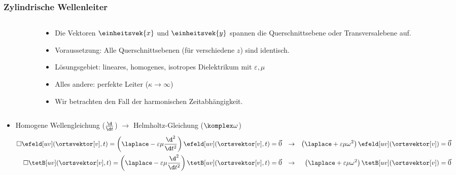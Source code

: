 \begin{frame}
  \frametitle{Zylindrische Wellenleiter}
  \begin{columns}
    \begin{column}{.3\linewidth}
  \end{column}
  \begin{column}{.7\linewidth}
      \begin{itemize}[<+->]
      \item Die Vektoren \(\einheitsvek{x}\) und \(\einheitsvek{y}\) spannen die \alert{Querschnittsebene} oder \alert{Transversalebene} auf.
      \item Voraussetzung: Alle Querschnittsebenen (für verschiedene \(z\)) sind identisch.
      \item Lösungsgebiet: lineares, homogenes, isotropes Dielektrikum mit \(\varepsilon, \mu\)
      \item Alles andere: perfekte Leiter (\(\kappa \to \infty\))
        \item Wir betrachten den Fall der \alert{harmonischen Zeitabhängigkeit}.
        \end{itemize}
  \end{column}
    \end{columns}
      \begin{itemize}[<+->]
      \item Homogene Wellengleichung (\(\frac{\d}{\d t}\)) \(\to\) \alert{Helmholtz-Gleichung} (\(\komplex\omega\))
        \begin{align*}
          \square \efeld[uv](\ortsvektor[v], t) = \left(\laplace - \varepsilon\mu\frac{\d^2}{\d t^2}\right) \efeld[uv] (\ortsvektor[v], t) = \vec{0} &&\rightarrow  &&\left(\laplace + \varepsilon\mu\omega^2\right) \efeld[uv](\ortsvektor[v]) =\vec{0} \\
          \square \tetB[uv](\ortsvektor[v], t) = \left(\laplace - \varepsilon\mu\frac{\d^2}{\d t^2}\right) \tetB[uv] (\ortsvektor[v], t) = \vec{0} &&\rightarrow  &&\left(\laplace + \varepsilon\mu\omega^2\right) \tetB[uv](\ortsvektor[v]) =\vec{0} 
        \end{align*}
        \end{itemize}
\end{frame}


